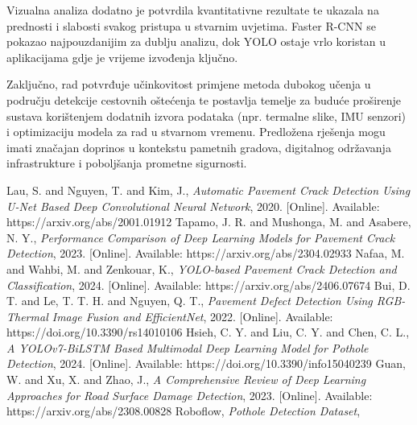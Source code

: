 \documentclass[conference]{IEEEtran}
\begin{document}
Vizualna analiza dodatno je potvrdila kvantitativne rezultate te ukazala na prednosti i slabosti svakog pristupa u stvarnim uvjetima. Faster R-CNN se pokazao najpouzdanijim za dublju analizu, dok YOLO ostaje vrlo koristan u aplikacijama gdje je vrijeme izvođenja ključno.

Zaključno, rad potvrđuje učinkovitost primjene metoda dubokog učenja u području detekcije cestovnih oštećenja te postavlja temelje za buduće proširenje sustava korištenjem dodatnih izvora podataka (npr. termalne slike, IMU senzori) i optimizaciju modela za rad u stvarnom vremenu. Predložena rješenja mogu imati značajan doprinos u kontekstu pametnih gradova, digitalnog održavanja infrastrukture i poboljšanja prometne sigurnosti.



\begin{thebibliography}{99}
 Lau, S. and Nguyen, T. and Kim, J., \textit{Automatic Pavement Crack Detection Using U-Net Based Deep Convolutional Neural Network}, 2020. [Online]. Available: https://arxiv.org/abs/2001.01912
 Tapamo, J. R. and Mushonga, M. and Asabere, N. Y., \textit{Performance Comparison of Deep Learning Models for Pavement Crack Detection}, 2023. [Online]. Available: https://arxiv.org/abs/2304.02933
 Nafaa, M. and Wahbi, M. and Zenkouar, K., \textit{YOLO-based Pavement Crack Detection and Classification}, 2024. [Online]. Available: https://arxiv.org/abs/2406.07674
 Bui, D. T. and Le, T. T. H. and Nguyen, Q. T., \textit{Pavement Defect Detection Using RGB-Thermal Image Fusion and EfficientNet}, 2022. [Online]. Available: https://doi.org/10.3390/rs14010106
 Hsieh, C. Y. and Liu, C. Y. and Chen, C. L., \textit{A YOLOv7-BiLSTM Based Multimodal Deep Learning Model for Pothole Detection}, 2024. [Online]. Available: https://doi.org/10.3390/info15040239
 Guan, W. and Xu, X. and Zhao, J., \textit{A Comprehensive Review of Deep Learning Approaches for Road Surface Damage Detection}, 2023. [Online]. Available: https://arxiv.org/abs/2308.00828
 Roboflow, \textit{Pothole Detection Dataset}, 
\end{thebibliography}

\end{document}
